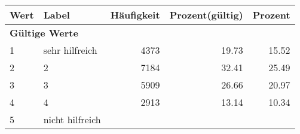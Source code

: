      \begin{longtable}{lXrrr}
     \toprule
     \textbf{Wert} & \textbf{Label} & \textbf{Häufigkeit} & \textbf{Prozent(gültig)} & \textbf{Prozent} \\
     \endhead
     \midrule
     \multicolumn{5}{l}{\textbf{Gültige Werte}}\\

     1 &
     \multicolumn{1}{X}{ sehr hilfreich   } &


       \num{4373} &
       \num[round-mode=places,round-precision=2]{19,73} &
         \num[round-mode=places,round-precision=2]{15,52} \\

     2 &
     \multicolumn{1}{X}{ 2   } &


       \num{7184} &
       \num[round-mode=places,round-precision=2]{32,41} &
         \num[round-mode=places,round-precision=2]{25,49} \\

     3 &
     \multicolumn{1}{X}{ 3   } &


       \num{5909} &
       \num[round-mode=places,round-precision=2]{26,66} &
         \num[round-mode=places,round-precision=2]{20,97} \\

     4 &
     \multicolumn{1}{X}{ 4   } &


       \num{2913} &
       \num[round-mode=places,round-precision=2]{13,14} &
         \num[round-mode=places,round-precision=2]{10,34} \\

     5 &
     \multicolumn{1}{X}{ nicht hilfreich   } &



\end{longtable}

